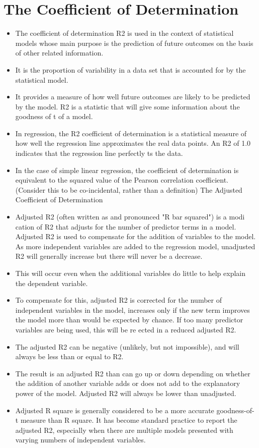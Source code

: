 \documentclass[]{report}
\begin{document}
\section*{The Coefficient of Determination}
\begin{itemize}
	
	\item  The coefficient of determination R2 is used in the context of statistical models whose main purpose is
	the prediction of future outcomes on the basis of other related information.
	\item  It is the proportion of variability in a data set that is accounted for by the statistical model.
	\item  It provides a measure of how well future outcomes are likely to be predicted by the model. R2 is a
	statistic that will give some information about the goodness of
	t of a model.
	\item  In regression, the R2 coefficient of determination is a statistical measure of how well the regression line
	approximates the real data points. An R2 of 1.0 indicates that the regression line perfectly ts the data.
	\item  In the case of simple linear regression, the coefficient of determination is equivalent to the squared value
	of the Pearson correlation coefficient. (Consider this to be co-incidental, rather than a definition)
	The Adjusted Coefficient of Determination
	\item  Adjusted R2 (often written as and pronounced "R bar squared") is a modi
	cation of R2 that adjusts for the number of predictor terms in a model. Adjusted R2 is used to compensate
	for the addition of variables to the model. As more independent variables are added to the regression
	model, unadjusted R2 will generally increase but there will never be a decrease.
	\item  This will occur even when the additional variables do little to help explain the dependent variable.
	\item  To compensate for this, adjusted R2 is corrected for the number of independent variables in the model,
	increases only if the new term improves the model more than would be expected by chance. If too many
	predictor variables are being used, this will be re
	ected in a reduced adjusted R2.
	\item  The adjusted R2 can be negative (unlikely, but not impossible), and will always be less than or equal to
	R2.
	\item  The result is an adjusted R2 than can go up or down depending on whether the addition of another
	variable adds or does not add to the explanatory power of the model. Adjusted R2 will always be lower
	than unadjusted.
	\item  Adjusted R square is generally considered to be a more accurate goodness-of-
	t measure than R square. It has become standard practice to report the adjusted R2, especially when
	there are multiple models presented with varying numbers of independent variables.
\end{itemize}
\end{document}
